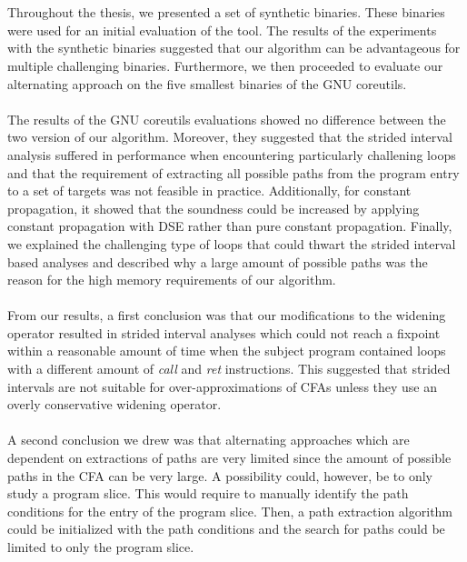\documentclass{kththesis}
\renewcommand{\it}[1]{\textit{#1}}
\begin{document}
\\ \\
Throughout the thesis, we presented a set of synthetic binaries. These binaries were used for an initial evaluation of the tool. The results of the experiments with the synthetic binaries suggested that our algorithm can be advantageous for multiple challenging binaries. Furthermore, we then proceeded to evaluate our alternating approach on the five smallest binaries of the GNU coreutils. 
\\ \\
The results of the GNU coreutils evaluations showed no difference between the two version of our algorithm. Moreover, they suggested that the strided interval analysis suffered in performance when encountering particularly challening loops and that the requirement of extracting all possible paths from the program entry to a set of targets was not feasible in practice. Additionally, for constant propagation, it showed that the soundness could be increased by applying constant propagation with DSE rather than pure constant propagation. Finally, we explained the challenging type of loops that could thwart the strided interval based analyses and described why a large amount of possible paths was the reason for the high memory requirements of our algorithm.
\\ \\
From our results, a first conclusion was that our modifications to the widening operator resulted in strided interval analyses which could not reach a fixpoint within a reasonable amount of time when the subject program contained loops with a different amount of \it{call} and \it{ret} instructions. This suggested that strided intervals are not suitable for over-approximations of CFAs unless they use an overly conservative widening operator. 
\\ \\
A second conclusion we drew was that alternating approaches which are dependent on extractions of paths are very limited since the amount of possible paths in the CFA can be very large. A possibility could, however, be to only study a program slice. This would require to manually identify the path conditions for the entry of the program slice. Then, a path extraction algorithm could be initialized with the path conditions and the search for paths could be limited to only the program slice. 
\end{document}
